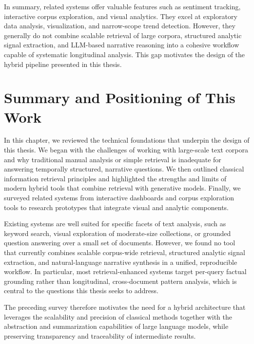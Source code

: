 In summary, related systems offer valuable features such as sentiment tracking, interactive corpus exploration, and visual analytics. They excel at exploratory data analysis, visualization, and narrow-scope trend detection. However, they generally do not combine scalable retrieval of large corpora, structured analytic signal extraction, and LLM-based narrative reasoning into a cohesive workflow capable of systematic longitudinal analysis. This gap motivates the design of the hybrid pipeline presented in this thesis.


\section{Summary and Positioning of This Work}

In this chapter, we reviewed the technical foundations that underpin the design of this thesis. We began with the challenges of working with large-scale text corpora and why traditional manual analysis or simple retrieval is inadequate for answering temporally structured, narrative questions. We then outlined classical information retrieval principles and highlighted the strengths and limits of modern hybrid tools that combine retrieval with generative models. Finally, we surveyed related systems from interactive dashboards and corpus exploration tools to research prototypes that integrate visual and analytic components.

Existing systems are well suited for specific facets of text analysis, such as keyword search, visual exploration of moderate-size collections, or grounded question answering over a small set of documents. However, we found no tool that currently combines scalable corpus-wide retrieval, structured analytic signal extraction, and natural-language narrative synthesis in a unified, reproducible workflow. In particular, most retrieval-enhanced systems target per-query factual grounding rather than longitudinal, cross-document pattern analysis, which is central to the questions this thesis seeks to address.

The preceding survey therefore motivates the need for a hybrid architecture that leverages the scalability and precision of classical methods together with the abstraction and summarization capabilities of large language models, while preserving transparency and traceability of intermediate results.

